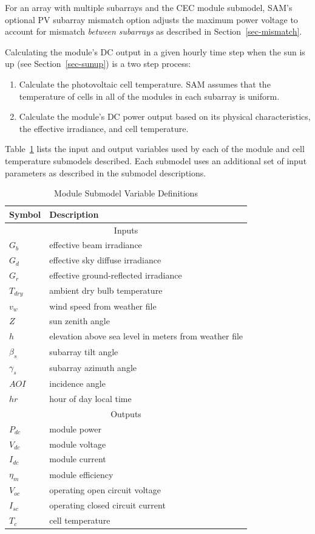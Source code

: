 \documentclass[12pt,letterpaper]{article}
\newcommand\AOI{\ensuremath{\mathit{AOI}}}
\begin{document}
For an array with multiple subarrays and the CEC module submodel, SAM's optional PV subarray mismatch option adjusts the maximum power voltage to account for mismatch \textit{between subarrays} as described in Section~\ref{sec-mismatch}.

Calculating the module's DC output in a given hourly time step when the sun is up (see Section~\ref{sec-sunup}) is a two step process:
\begin{enumerate}
\item Calculate the photovoltaic cell temperature. SAM assumes that the temperature of cells in all of the modules in each subarray is uniform.
\item Calculate the module's DC power output based on its physical characteristics, the effective irradiance, and cell temperature.
\end{enumerate}

Table~\ref{tab-modulevars} lists the input and output variables used by each of the module and cell temperature submodels described. Each submodel uses an additional set of input parameters as described in the submodel descriptions.

\begin{table}
\begin{center}
\caption{Module Submodel Variable Definitions}
\begin{tabular}{ll}
\midrule
Symbol & Description \\
\midrule
\multicolumn{2}{c}{Inputs}\\
$G_b$ & effective beam irradiance \\
$G_d$ & effective sky diffuse irradiance \\
$G_r$ & effective ground-reflected irradiance  \\
$T_{dry}$ & ambient dry bulb temperature  \\
$v_w$ & wind speed from weather file \\
$Z$ & sun zenith angle \\
$h$ & elevation above sea level in meters from weather file \\
$\beta_s$ & subarray tilt angle \\
$\gamma_s$ & subarray azimuth angle \\
$\AOI$ & incidence angle \\
$\mathit{hr}$ & hour of day local time \\
\midrule
\multicolumn{2}{c}{Outputs}\\
$P_{dc}$ & module power \\
$V_{dc}$ & module voltage \\
$I_{dc}$ & module current  \\
$\eta_m$ & module efficiency \\
$V_{oc}$ & operating open circuit voltage  \\
$I_{sc}$ & operating closed circuit current \\
$T_c$ & cell temperature \\
\midrule
\end{tabular}
\label{tab-modulevars}
\end{center}
\end{table}
\end{document}
